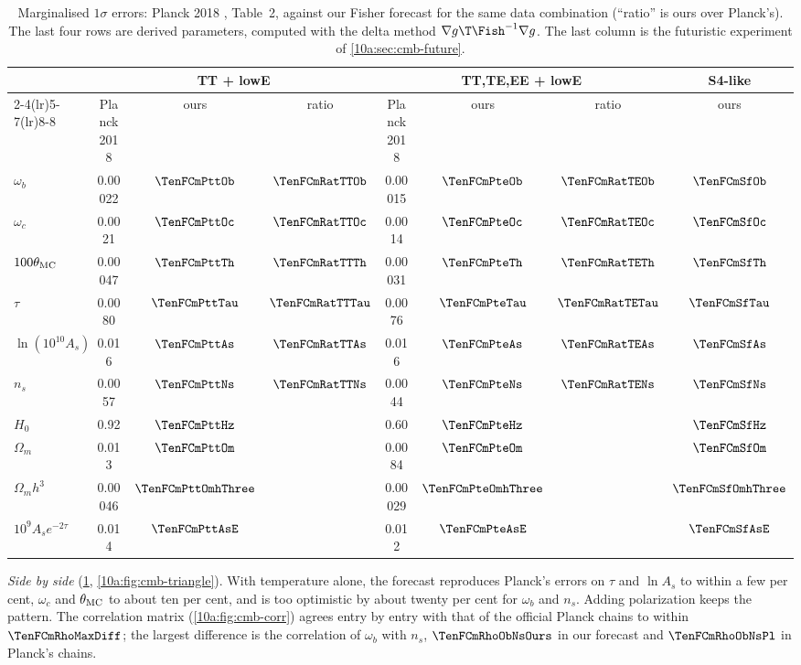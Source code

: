 \begin{table}[htbp]
\centering
\small
\renewcommand{\arraystretch}{1.2}
\begin{tabular}{@{}l ccc ccc c@{}}
\toprule
 & \multicolumn{3}{c}{TT + lowE} & \multicolumn{3}{c}{TT,TE,EE + lowE} & S4-like\\
\cmidrule(lr){2-4}\cmidrule(lr){5-7}\cmidrule(lr){8-8}
 & Planck 2018 & ours & ratio & Planck 2018 & ours & ratio & ours\\\midrule
$\omega_b$ & 0.00022 & $\TenFCmPttOb$ & $\TenFCmRatTTOb$ & 0.00015 & $\TenFCmPteOb$ & $\TenFCmRatTEOb$ & $\TenFCmSfOb$\\
$\omega_c$ & 0.0021 & $\TenFCmPttOc$ & $\TenFCmRatTTOc$ & 0.0014 & $\TenFCmPteOc$ & $\TenFCmRatTEOc$ & $\TenFCmSfOc$\\
$100\theta_{\rm MC}$ & 0.00047 & $\TenFCmPttTh$ & $\TenFCmRatTTTh$ & 0.00031 & $\TenFCmPteTh$ & $\TenFCmRatTETh$ & $\TenFCmSfTh$\\
$\tau$ & 0.0080 & $\TenFCmPttTau$ & $\TenFCmRatTTTau$ & 0.0076 & $\TenFCmPteTau$ & $\TenFCmRatTETau$ & $\TenFCmSfTau$\\
$\ln(10^{10}A_s)$ & 0.016 & $\TenFCmPttAs$ & $\TenFCmRatTTAs$ & 0.016 & $\TenFCmPteAs$ & $\TenFCmRatTEAs$ & $\TenFCmSfAs$\\
$n_s$ & 0.0057 & $\TenFCmPttNs$ & $\TenFCmRatTTNs$ & 0.0044 & $\TenFCmPteNs$ & $\TenFCmRatTENs$ & $\TenFCmSfNs$\\\midrule
$H_0$ & 0.92 & $\TenFCmPttHz$ & & 0.60 & $\TenFCmPteHz$ & & $\TenFCmSfHz$\\
$\Omega_m$ & 0.013 & $\TenFCmPttOm$ & & 0.0084 & $\TenFCmPteOm$ & & $\TenFCmSfOm$\\
$\Omega_mh^3$ & 0.00046 & $\TenFCmPttOmhThree$ & & 0.00029 & $\TenFCmPteOmhThree$ & & $\TenFCmSfOmhThree$\\
$10^9A_se^{-2\tau}$ & 0.014 & $\TenFCmPttAsE$ & & 0.012 & $\TenFCmPteAsE$ & & $\TenFCmSfAsE$\\
\bottomrule
\end{tabular}
\caption{Marginalised $1\sigma$ errors: Planck 2018 \cite{Planck2018VI}, Table~2, against our Fisher forecast for the
same data combination (``ratio'' is ours over Planck's). The last four rows are derived parameters, computed
with the delta method $\nabla g\T\Fish^{-1}\nabla g$. The last column is the futuristic experiment of
\cref{10a:sec:cmb-future}.}
\label{10a:tab:planck}
\end{table}

\emph{Side by side} (\cref{10a:tab:planck}, \cref{10a:fig:cmb-triangle}). With temperature alone, the forecast
reproduces Planck's errors on $\tau$ and $\ln A_s$ to within a few per cent, $\omega_c$ and $\theta_{\rm MC}$ to about ten per
cent, and is too optimistic by about twenty per cent for $\omega_b$ and $n_s$. Adding polarization keeps the pattern.
The correlation matrix (\cref{10a:fig:cmb-corr}) agrees entry by entry with that of the official Planck chains
to within $\TenFCmRhoMaxDiff$; the largest difference is the correlation of $\omega_b$ with $n_s$, $\TenFCmRhoObNsOurs$ in our
forecast and $\TenFCmRhoObNsPl$ in Planck's chains.

